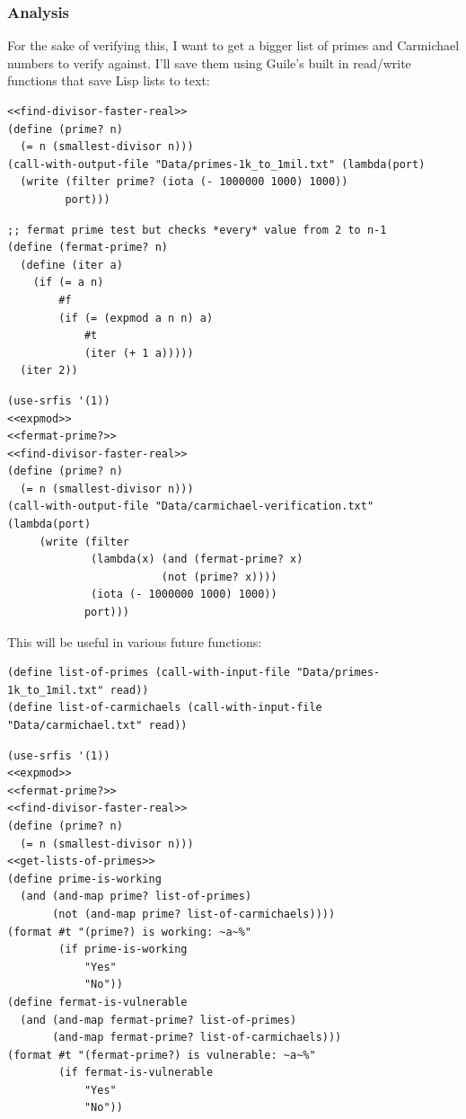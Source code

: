 \documentclass[final,fleqn,titlepage,twoside]{article}
\begin{document}
\subsubsection{Analysis}
\label{sec:org6646999}
For the sake of verifying this, I want to get a bigger list of primes and
Carmichael numbers to verify against. I'll save them using Guile's built in
read/write functions that save Lisp lists to text:
\begin{verbatim}
<<find-divisor-faster-real>>
(define (prime? n)
  (= n (smallest-divisor n)))
(call-with-output-file "Data/primes-1k_to_1mil.txt" (lambda(port)
  (write (filter prime? (iota (- 1000000 1000) 1000))
         port)))
\end{verbatim}

\begin{verbatim}
;; fermat prime test but checks *every* value from 2 to n-1
(define (fermat-prime? n)
  (define (iter a)
    (if (= a n)
        #f
        (if (= (expmod a n n) a)
            #t
            (iter (+ 1 a)))))
  (iter 2))
\end{verbatim}

\begin{verbatim}
(use-srfis '(1))
<<expmod>>
<<fermat-prime?>>
<<find-divisor-faster-real>>
(define (prime? n)
  (= n (smallest-divisor n)))
(call-with-output-file "Data/carmichael-verification.txt" (lambda(port)
     (write (filter
             (lambda(x) (and (fermat-prime? x)
                        (not (prime? x))))
             (iota (- 1000000 1000) 1000))
            port)))
\end{verbatim}

This will be useful in various future functions:
\begin{verbatim}
(define list-of-primes (call-with-input-file "Data/primes-1k_to_1mil.txt" read))
(define list-of-carmichaels (call-with-input-file "Data/carmichael.txt" read))
\end{verbatim}

\begin{verbatim}
(use-srfis '(1))
<<expmod>>
<<fermat-prime?>>
<<find-divisor-faster-real>>
(define (prime? n)
  (= n (smallest-divisor n)))
<<get-lists-of-primes>>
(define prime-is-working
  (and (and-map prime? list-of-primes)
       (not (and-map prime? list-of-carmichaels))))
(format #t "(prime?) is working: ~a~%"
        (if prime-is-working
            "Yes"
            "No"))
(define fermat-is-vulnerable
  (and (and-map fermat-prime? list-of-primes)
       (and-map fermat-prime? list-of-carmichaels)))
(format #t "(fermat-prime?) is vulnerable: ~a~%"
        (if fermat-is-vulnerable
            "Yes"
            "No"))
\end{verbatim}
\end{document}
